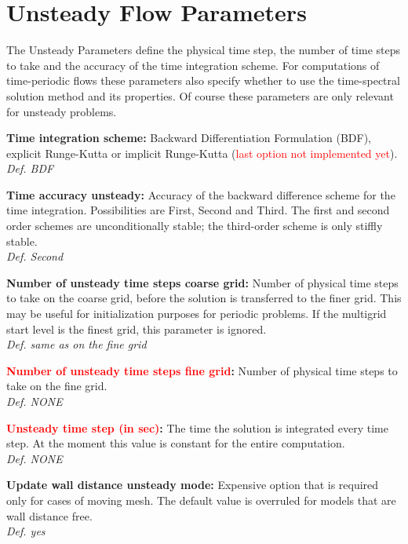 \documentclass[12pt,epsf,colordvi]{article}
\begin{document}
\section{Unsteady Flow Parameters}
% 
The Unsteady Parameters define the physical time step, the number of time steps to take and the accuracy of the time integration scheme. For computations of time-periodic flows these parameters also specify whether to use the time-spectral solution method and its properties. Of course these parameters are only relevant for unsteady problems.
%
\begin{description}	
%
        \item{\bf  Time integration scheme:} Backward Differentiation Formulation (BDF), explicit Runge-Kutta or implicit Runge-Kutta (\textcolor{red}{last option not implemented yet}).\\
{\it Def. BDF}
%
        \item{\bf Time accuracy unsteady:} Accuracy of the backward difference scheme for the time integration. Possibilities are First, Second and Third. The first and second order schemes are unconditionally stable; the third-order scheme is only stiffly stable. \\
{\it Def.  Second}
%
        \item{\bf Number of unsteady time steps coarse grid:} Number of physical time steps to take on the coarse grid, before the solution is transferred to the finer grid. This may be useful for initialization purposes for periodic problems.  If the multigrid start level is the finest grid, this parameter is ignored. \\
{\it Def.  same as on the fine grid}
%
        \item{\bf \textcolor{red}{Number of unsteady time steps fine grid}:} Number of physical time steps to take on the fine grid. \\
{\it Def. NONE}
%
         \item{\bf \textcolor{red}{Unsteady time step (in sec)}:} The time the solution is integrated every time step. At the moment this value is constant for the entire computation. \\
{\it Def. NONE}
%
          \item{\bf Update wall distance unsteady mode:} Expensive option that is required only for cases of moving mesh. The default value is overruled for models that are wall distance free.\\
{\it Def. yes} 
%
\end{description}
%
\noindent 
\end{document}
